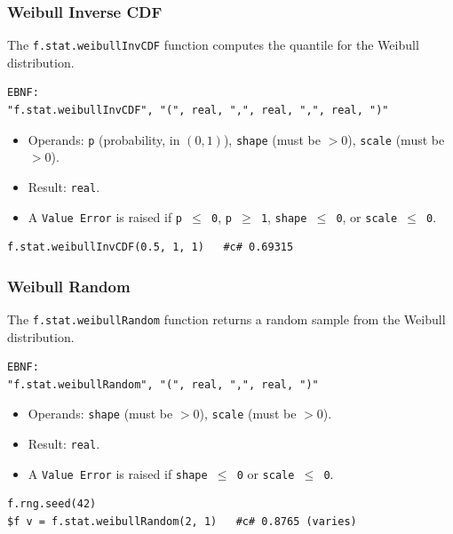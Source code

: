 \subsubsection{Weibull Inverse CDF}
The \texttt{f.stat.weibullInvCDF} function computes the quantile for the Weibull distribution.
\begin{verbatim}
EBNF:
"f.stat.weibullInvCDF", "(", real, ",", real, ",", real, ")"
\end{verbatim}
\begin{itemize}
\item Operands: \texttt{p} (probability, in $(0, 1)$), \texttt{shape} (must be $> 0$), \texttt{scale} (must be $> 0$).
\item Result: \texttt{real}.
\item A \texttt{Value Error} is raised if \texttt{p $\leq$ 0}, \texttt{p $\geq$ 1}, \texttt{shape $\leq$ 0}, or \texttt{scale $\leq$ 0}.
\end{itemize}
\begin{verbatim}
f.stat.weibullInvCDF(0.5, 1, 1)   #c# 0.69315
\end{verbatim}

\subsubsection{Weibull Random}
The \texttt{f.stat.weibullRandom} function returns a random sample from the Weibull distribution.
\begin{verbatim}
EBNF:
"f.stat.weibullRandom", "(", real, ",", real, ")"
\end{verbatim}
\begin{itemize}
\item Operands: \texttt{shape} (must be $> 0$), \texttt{scale} (must be $> 0$).
\item Result: \texttt{real}.
\item A \texttt{Value Error} is raised if \texttt{shape $\leq$ 0} or \texttt{scale $\leq$ 0}.
\end{itemize}
\begin{verbatim}
f.rng.seed(42)
$f v = f.stat.weibullRandom(2, 1)   #c# 0.8765 (varies)
\end{verbatim}

